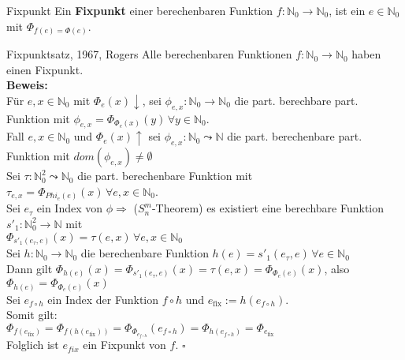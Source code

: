 \begin{defn}{Fixpunkt}
    Ein \textbf{Fixpunkt} einer berechenbaren Funktion $f: \mathbb{N}_0 \rightarrow \mathbb{N}_0$, ist ein 
    $e \in \mathbb{N}_0$ mit $\Phi_{f(e) = \Phi(e)}$.
\end{defn}

\begin{satz}{Fixpunktsatz, 1967, Rogers}
    Alle berechenbaren Funktionen $f: \mathbb{N}_0 \rightarrow \mathbb{N}_0$ haben einen Fixpunkt. \\

    \textbf{Beweis:} \\
    Für $e,x \in \mathbb{N}_0$ mit $\Phi_e(x)\downarrow$, sei $\phi_{e,x} : \mathbb{N}_0 \rightarrow \mathbb{N}_0$ die 
    part. berechbare part. Funktion mit $\phi_{e,x} = \Phi_{\Phi_e(x)}(y) \, \forall y \in \mathbb{N}_0$. \\
    Fall $e,x \in \mathbb{N}_0$ und $\Phi_e(x)\uparrow$ sei $\phi_{e,x}: \mathbb{N}_0 \leadsto \mathbb{N}$ die part. berechenbare part.
    Funktion mit $dom(\phi_{e,x}) \neq \emptyset$ \\

    Sei $\tau : \mathbb{N}_0^2 \leadsto \mathbb{N}_0$ die part. berechenbare Funktion mit  $\tau_{e,x} = \Phi_{Phi_e(e)}(x) \,
    \forall e,x \in \mathbb{N}_0$. \\

    Sei $e_\tau$ ein Index von $\phi \Rightarrow$ ($S^m_n$-Theorem) es existiert eine berechbare Funktion
    $s'_1: \mathbb{N}_0^2 \rightarrow \mathbb{N}$ mit \\
    $\Phi_{s'_1(e_\tau,e)}(x) = \tau(e,x) \, \forall e,x \in \mathbb{N}_0$ \\

    Sei $h: \mathbb{N}_0 \rightarrow \mathbb{N}_0$ die berechenbare Funktion $h(e) = s'_1(e_\tau,e) \, \forall e \in \mathbb{N}_0$ \\
    Dann gilt $\Phi_{h(e)}(x) = \Phi_{s'_1(e_\tau,e)}(x) = \tau(e,x) = \Phi_{\Phi_e(e)}(x)$, also \\
    $\Phi_{h(e)} = \Phi_{\Phi_e(e)}(x)$ \\

    Sei $e_{f \circ h}$ ein Index der Funktion $f \circ h$ und $e_{\text{fix}}:=h(e_{f \circ h})$. \\
    Somit gilt: \\
    $\Phi_{f(e_{\text{fix}})} = \Phi_{f(h(e_{\text{fix}}))} = \Phi_{\Phi_{e_{f \circ h}}}(e_{f \circ h}) = \Phi_{h(e_{f \circ h})} = \Phi_{e_{\text{fix}}}$ \\

    Folglich ist $e_{fix}$ ein Fixpunkt von $f$. $\square$
\end{satz}